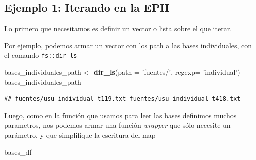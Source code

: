 \documentclass[]{book}
\newenvironment{Shaded}{\begin{snugshade}}{\end{snugshade}}
\newcommand{\ControlFlowTok}[1]{\textcolor[rgb]{0.13,0.29,0.53}{\textbf{#1}}}
\newcommand{\DataTypeTok}[1]{\textcolor[rgb]{0.13,0.29,0.53}{#1}}
\newcommand{\KeywordTok}[1]{\textcolor[rgb]{0.13,0.29,0.53}{\textbf{#1}}}
\newcommand{\NormalTok}[1]{#1}
\newcommand{\OperatorTok}[1]{\textcolor[rgb]{0.81,0.36,0.00}{\textbf{#1}}}
\newcommand{\OtherTok}[1]{\textcolor[rgb]{0.56,0.35,0.01}{#1}}
\newcommand{\StringTok}[1]{\textcolor[rgb]{0.31,0.60,0.02}{#1}}
\begin{document}
\hypertarget{ejemplo-1-iterando-en-la-eph}{%
\subsection{Ejemplo 1: Iterando en la EPH}\label{ejemplo-1-iterando-en-la-eph}}

Lo primero que necesitamos es definir un vector o lista sobre el que iterar.

Por ejemplo, podemos armar un vector con los path a las bases individuales, con el comando \texttt{fs::dir\_ls}

\begin{Shaded}
\begin{Highlighting}[]
\NormalTok{bases_individuales_path <-}\StringTok{ }\KeywordTok{dir_ls}\NormalTok{(}\DataTypeTok{path =} \StringTok{'fuentes/'}\NormalTok{, }\DataTypeTok{regexp=} \StringTok{'individual'}\NormalTok{)}
\NormalTok{bases_individuales_path}
\end{Highlighting}
\end{Shaded}

\begin{verbatim}
## fuentes/usu_individual_t119.txt fuentes/usu_individual_t418.txt
\end{verbatim}

Luego, como en la función que usamos para leer las bases definimos muchos parametros, nos podemos armar una función \emph{wrapper} que sólo necesite un parámetro, y que simplifique la escritura del map

\begin{Shaded}
\end{Shaded}

\begin{Shaded}
\begin{Highlighting}[]
\NormalTok{bases_df}
\end{Highlighting}
\end{Shaded}
\end{document}
